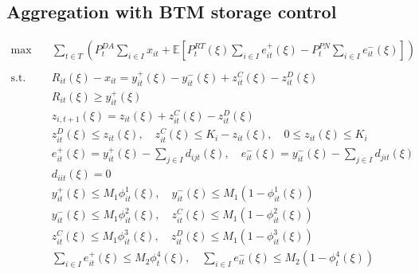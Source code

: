 \documentclass[10pt]{article}
\begin{document}
\subsection{Aggregation with BTM storage control}
\begin{subequations}
    \begin{align}
        \text{max} \quad &\sum_{t\in T}\left(P_t^{DA} \sum_{i \in I}x_{it} + \mathbb{E}\left[P_t^{RT}(\xi)\sum_{i \in I}e^+_{it}(\xi) - P_t^{PN}\sum_{i \in I}e^-_{it}(\xi)\right]\right)&\\ 
        &&\\   
        \text{s.t.} \quad &R_{it}(\xi) - x_{it} = y_{it}^{+}(\xi) - y_{it}^{-}(\xi) + z^C_{it}(\xi) - z^D_{it}(\xi)&\\
        & R_{it}(\xi) \geq y^+_{it}(\xi)&\\
        &z_{i,t+1}(\xi) = z_{it}(\xi) + z^C_{it}(\xi) - z^D_{it}(\xi)&\\
        &z^D_{it}(\xi) \le z_{it}(\xi), \quad z^C_{it}(\xi) \le K_i-z_{it}(\xi), \quad 0 \leq z_{it}(\xi) \leq K_i &\\
        &e^+_{it}(\xi) = y^+_{it}(\xi) - \sum_{j \in I}d_{ijt}(\xi), \quad e^-_{it}(\xi) = y^-_{it}(\xi) - \sum_{j \in I}d_{jit}(\xi)&\\
        &d_{iit}(\xi) = 0&\\
        &y^+_{it}(\xi) \leq M_1 \phi^1_{it}(\xi), \quad y^-_{it}(\xi) \leq M_1 (1 - \phi^1_{it}(\xi)) &\\
        &y^-_{it}(\xi) \leq M_1 \phi^2_{it}(\xi), \quad z^C_{it}(\xi) \leq M_1 (1 - \phi^2_{it}(\xi)) &\\
        &z^C_{it}(\xi) \leq M_1 \phi^3_{it}(\xi), \quad z^D_{it}(\xi) \leq M_1 (1 - \phi^3_{it}(\xi)) &\\
        &\sum_{i \in I}e^+_{it}(\xi) \leq M_2 \phi^4_{t}(\xi), \quad \sum_{i \in I}e^-_{it}(\xi) \leq M_2 (1 - \phi^4_{t}(\xi))&
    \end{align}
\end{subequations}
\end{document}
